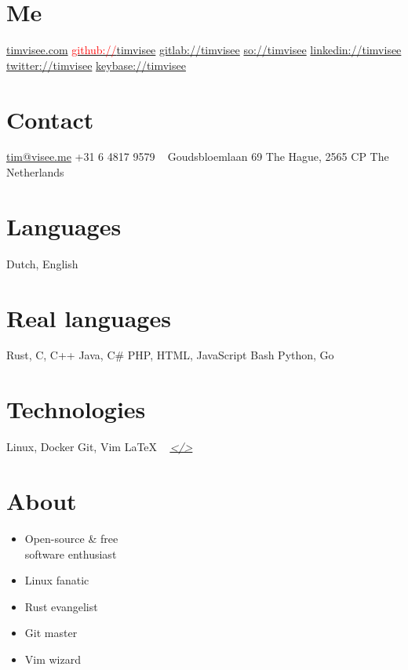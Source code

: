 \documentclass[]{friggeri-cv}
\providecommand{\tightlist}{%
\setlength{\itemsep}{0pt}\setlength{\parskip}{0pt}}
\begin{document}


\begin{aside}
\section{Me}
\href{https://timvisee.com/}{timvisee.com}
\href{https://github.com/timvisee}{\textcolor{red}{github://}timvisee}
\href{https://gitlab.com/timvisee}{gitlab://timvisee}
\href{https://stackoverflow.com/users/1000145}{so://timvisee}
\href{https://linkedin.com/in/timvisee}{linkedin://timvisee}
\href{https://twitter.com/timvisee}{twitter://timvisee}
\href{https://keybase.io/timvisee}{keybase://timvisee}
\section{Contact}
\href{mailto:tim@visee.me}{tim@visee.me}
+31 6 4817 9579
~
Goudsbloemlaan 69
The Hague, 2565 CP
The Netherlands
\section{Languages}
Dutch, English
\section{Real languages}
Rust, C, C++
Java, C\#
PHP, HTML, JavaScript
Bash
Python, Go
\section{Technologies}
Linux, Docker
Git, Vim
\LaTeX{}
~
\textit{\href{https://github.com/timvisee/cv}{</>}}
\end{aside}


\section{About}
\begin{multicols}{2}
\begin{itemize}
  \tightlist{}
  \item Open-source \& free \\software enthusiast
  \item Linux fanatic
  \item Rust evangelist
  \item Git master
  \item Vim wizard
\end{itemize}
\end{multicols}
\end{document}
